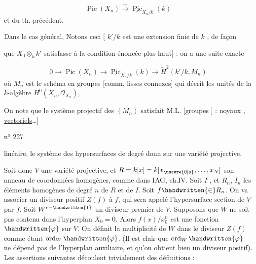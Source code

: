 \[
\operatorname{Pic}(X_n)\overset{\sim}{\longrightarrow}\underline{\operatorname{Pic}}_{X_n/k}(k)
\]
et du th. précédent.

Dans le cas général, Notons  ceci [ $k'/k$ est une extension
finie de $k$ ,   de façon


que  $X_0\otimes_k k'$ satisfasse à la condition
énoncée plus haut] : on a une suite exacte

\[
0\longrightarrow\operatorname{Pic}(X_n)\longrightarrow\underline{\operatorname{Pic}}_{X_n/k}(k)\longrightarrow\check H^2(k'/k,M_n)
\]
où $M_n$ est le schéma en groupes [comm. lisses
connexes]  qui décrit les unités
de la $k$-algèbre  $H^0(X_n,\mathcal O_{X_n})$,

On note que le système projectif des
$(M_n)$ satisfait M.L. [groupes ]
 : noyaux  , \uline{vectoriels}\ldots]

n$^{\mathrm{o}}$ 227

linéaire, le système des hypersurfaces de degré donn sur une
variété projective.

Soit donc $V$ une variété projective, et $R=k[x]=k[x_{\unsure{0|o}},\ldots,x_N]$
son anneau de coordonnées homogènes, comme dans IAG, ch.IV. Soit $I$
, et $R_n$, $I_n$ les éléments homogènes de
degré $n$ de $R$ et de $I$. Soit $f\handwritten{\in}R_n$. On va associer un diviseur positif
$Z(f)$ à $f$, qui sera appelé l'hypersurface section de $V$ par $f$. Soit
$W^{r-\handwritten{1}}$ un diviseur premier de $V$. Supposons que $W$ ne soit pas contenu
dans l'hyperplan $X_0=0$. Alors $f(x)/x_0^n$ est une fonction $\handwritten{\varphi}$ sur $V$. On
définit la multiplicité de $W$ dans le diviseur $Z(f)$ comme étant
$\operatorname{ord}_W\handwritten{\varphi}$. (Il est clair que $\operatorname{ord}_W\handwritten{\varphi}$ ne dépend pas de l'hyperplan auxiliaire,
et qu'on obtient bien un diviseur positif). Les assertions
suivantes découlent trivialement des définitions :

